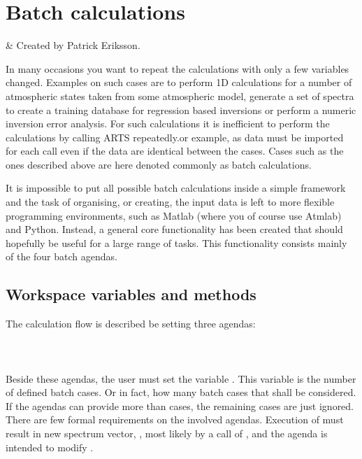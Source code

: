 \chapter{Batch calculations}
 \label{sec:batch}


%
%
 & Created by Patrick Eriksson.\\
\stophistory

In many occasions you want to repeat the calculations with only a few
variables changed. Examples on such cases are to perform 1D
calculations for a number of atmospheric states taken from some
atmospheric model, generate a set of spectra to create a training
database for regression based inversions or perform a numeric
inversion error analysis. For such calculations it is inefficient to
perform the calculations by calling ARTS repeatedly.or example, as
data must be imported for each call even if the data are identical
between the cases. Cases such as the ones described above are here
denoted commonly as batch calculations.

It is impossible to put all possible batch calculations inside a
simple framework and the task of organising, or creating, the input
data is left to more flexible programming environments, such as
Matlab (where you of course use Atmlab) and Python. Instead, a general
core functionality has been created that should hopefully be useful
for a large range of tasks. This functionality consists mainly of the
four batch agendas.


\section{Workspace variables and methods}
%
The calculation flow is described be setting three agendas:\\
\indent {} \\
\indent {} \\
\indent {} \\
Beside these agendas, the user must set the variable
. This variable is the number of defined batch
cases. Or in fact, how many batch cases that shall be considered. If
the agendas can provide more than  cases, the
remaining cases are just ignored. There are few formal requirements on
the involved agendas. Execution of 
must result in new spectrum vector, , most likely by a
call of , and the agenda
 is intended to modify .

